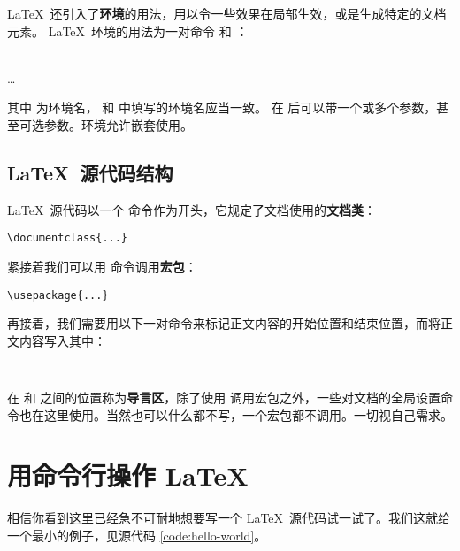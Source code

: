 \LaTeX\ 还引入了\textbf{环境}的用法，用以令一些效果在局部生效，或是生成特定的文档元素。
\LaTeX\ 环境的用法为一对命令  和 ：
\begin{command}
 \\
\ldots \\
\end{command}

其中  为环境名， 和  中填写的环境名应当一致。
 在  后可以带一个或多个参数，甚至可选参数。环境允许嵌套使用。

\subsection{\LaTeX\ 源代码结构}\label{subsec:struct}

\LaTeX\ 源代码以一个  命令作为开头，它规定了文档使用的\textbf{文档类}：
\begin{verbatim}
\documentclass{...}
\end{verbatim}

紧接着我们可以用  命令调用\textbf{宏包}：
\begin{verbatim}
\usepackage{...}
\end{verbatim}

再接着，我们需要用以下一对命令来标记正文内容的开始位置和结束位置，而将正文内容写入其中：
\begin{verbatim}


\end{verbatim}

在  和  之间的位置称为\textbf{导言区}，除了使用 
调用宏包之外，一些对文档的全局设置命令也在这里使用。当然也可以什么都不写，一个宏包都不调用。一切视自己需求。

\section{用命令行操作 \LaTeX}\label{sec:run}

相信你看到这里已经急不可耐地想要写一个 \LaTeX\ 源代码试一试了。我们这就给一个最小的例子，见源代码 \ref{code:hello-world}。

